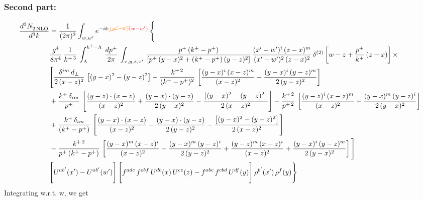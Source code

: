 \documentclass[9pt]{article}
\numberwithin{equation}{section}
\begin{document}
\subsubsection{Second part:}
\begin{align}
    \frac{d^{3}N_{2\,\rm NLO}^{\rm}}{d^{3}k}  & =  \frac{1}{(2\pi)^{3}}  \int_{w, w^\prime} e^{-ik\cdot{\color{orange}\cancel{(w^\prime-w)}}{\color{red}(w-w^\prime)}}\, \Bigg\{\notag \\ & \frac{g^{4}}{8\pi^{4}}\,\frac{1}{k^{+\,3}}\,\int_{\Lambda}^{k^{+}-\Lambda}\, \frac{dp^{+}}{2\pi} \, \int_{x,y,z,x'}\,\frac{p^{+}\,(k^{+}-p^{+})}{\left[p^{+}\,(y-x)^{2}+(k^{+}-p^{+})\,(y-z)^{2}\right]}\, \frac{(x'-w')^{i}\,(z-x)^{m}}{(x'-w')^{2}\,(z-x)^{2}}\,\delta^{(2)}\left[w-z+\frac{p^{+}}{k^{+}}\,(z-x)\right]\times \notag \\ & \Bigg[\frac{\delta^{im}\,d_{\perp}}{2\,(x-z)^{2}}\,\left[(y-x)^{2}-(y-z)^{2}\right]-\frac{k^{+\,2}}{(k^{+}-p^{+})^{2}}\,\left[\frac{(y-x)^{i}\,(x-z)^{m}}{(x-z)^{2}}-\frac{(y-x)^{i}\,(y-z)^{m}}{2\,(y-z)^{2}}\right]\notag \\ & +\frac{k^{+}\,\delta_{im}}{p^{+}}\,\left[\frac{(y-z)\cdot (x-z)}{(x-z)^{2}}+\frac{(y-x)\cdot (y-z)}{2\,(y-x)^{2}}-\frac{\left[(y-x)^{2}-(y-z)^{2}\right]}{2\,(x-z)^{2}}\right]-\frac{k^{+\,2}}{p^{+\,2}}\,\left[\frac{(y-z)^{i}\,(x-z)^{m}}{(x-z)^{2}}+\frac{(y-x)^{m}\,(y-z)^{i}}{2\,(y-x)^{2}}\right]\notag \\ & +\frac{k^{+}\,\delta_{im}}{(k^{+}-p^{+})}\,\left[\frac{(y-x)\cdot (x-z)}{(x-z)^{2}}-\frac{(y-x)\cdot (y-z)}{2\,(y-z)^{2}}-\frac{\left[(y-x)^{2}-(y-z)^{2}\right]}{2\,(x-z)^{2}}\right]\notag \\ &-\frac{k^{+\,2}}{p^{+}\, (k^{+}-p^{+})}\,\left[\frac{(y-x)^{m}\,(x-z)^{i}}{(x-z)^{2}}-\frac{(y-x)^{m}\,(y-z)^{i}}{2\,(y-z)^{2}}+\frac{(y-z)^{m}\,(x-z)^{i}}{(x-z)^{2}}+\frac{(y-x)^{i}\,(y-z)^{m}}{2\,(y-x)^{2}}\right]\Bigg] \notag \\ & \Bigg[U^{ab'}(x')-U^{ab'}(w')\Bigg]\,\Bigg[f^{adc}\,f^{ebf}\,U^{db}(x)\,U^{ce}(z)-f^{abc}\,f^{cbd}\,U^{df}(y)\Bigg]\,\rho^{b'}(x')\,\rho^{f}(y)\Bigg\}
\end{align}
Integrating w.r.t. w, we get
\end{document}
